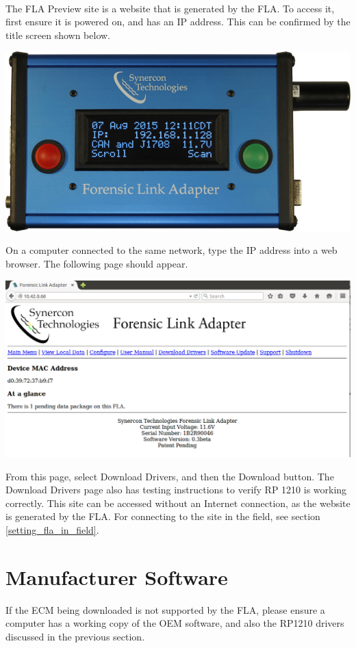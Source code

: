 \documentclass[11pt, oneside]{book}
\begin{document}
\paragraph{  }
The FLA Preview site is a website that is generated by the FLA. To access it, first ensure it is powered on, and has an IP address. This can be confirmed by the title screen shown below.
\begin{center}
\includegraphics[width=0.5\linewidth]{../media/fla_screens/ethernet_and_others/main/title_both}\label{fig:fla_title_screen}
\end{center}
On a computer connected to the same network, type the IP address into a web browser. The following page should appear.
\begin{center}
\includegraphics[width=1\linewidth]{../media/fla_preview_screenshots/main_page}\label{fig:preview_main_page}
\end{center}
From this page, select Download Drivers, and then the Download button. The Download Drivers page also has testing instructions to verify RP 1210 is working correctly. This site can be accessed without an Internet connection, as the website is generated by the FLA. For connecting to the site in the field, see section \ref{setting_fla_in_field}.
\section{Manufacturer Software}
If the ECM being downloaded is not supported by the FLA, please ensure a computer has a working copy of the OEM software, and also the RP1210 drivers discussed in the previous section.
\end{document}

